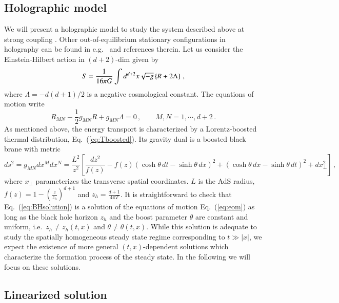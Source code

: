 \documentclass[epj]{webofc}
\begin{document}
\subsection{Holographic model}
\label{subsec:model}

We will present a holographic model to study the system described above at strong coupling . Other out-of-equilibrium stationary configurations in holography can be found in e.g.~\cite{Khlebnikov:2011ka,Fischetti:2012vt,Emparan:2013fha,Ecker:2015kna,Herzog:2016hob} and references therein. Let us consider the Einstein-Hilbert action in $(d+2)$-dim given by
\begin{equation}
S= {1 \over 16\pi G} \int d^{d+2}x \sqrt{-g}\left\{  R + 2\Lambda \right\}  \,, \label{eq:S}
\end{equation}
where $\Lambda = -d(d+1)/2$ is a negative cosmological constant. The equations of motion write
\begin{equation}
R_{MN} - \frac{1}{2}g_{MN} R + g_{MN} \Lambda = 0 \,, \qquad M, N = 1,\cdots, d+2 \,. \label{eq:eom}
\end{equation}
As mentioned above, the energy transport is characterized by a Lorentz-boosted thermal distribution, Eq.~(\ref{eq:Tboosted}). Its gravity dual is a boosted black brane with metric~\cite{Bhaseen:2013ypa}
\begin{equation}
ds^2 = g_{MN} dx^M dx^N = \frac{L^2}{z^2} \left[ \frac{dz^2}{f(z)} 
- f(z) \left( \cosh \theta \, dt - \sinh \theta \, dx \right)^2 
+ \left( \cosh \theta \, dx - \sinh \theta \, dt \right)^2
+ dx_\perp^2
\right] \,, \label{eq:BHsolution}
\end{equation}
where $x_\perp$ parameterizes the transverse spatial coordinates. $L$ is the AdS radius, $f(z) = 1-\left(\frac{z}{z_h}\right)^{d+1}$ and $z_h = \frac{d+1}{4\pi T}$.  It is straightforward to check that Eq.~(\ref{eq:BHsolution}) is a solution of the equations of motion Eq.~(\ref{eq:eom}) as long as the black hole horizon $z_h$ and the boost parameter $\theta$ are constant and uniform, i.e.~$z_h \ne z_h(t,x)$ and $\theta \ne \theta(t,x)$. While this solution is adequate to study the spatially homogeneous steady state regime corresponding to $t \gg |x|$, we expect the existence of more general $(t,x)$-dependent solutions which characterize the formation process of the steady state. In the following we will focus on these solutions.



\subsection{Linearized solution}
\label{sec:linearization}
\end{document}
